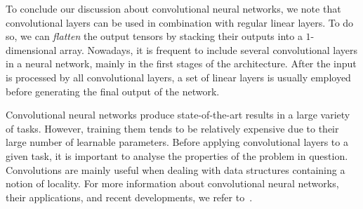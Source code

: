 \begin{figure}
\end{figure}
 
To conclude our discussion about convolutional neural networks, we note that convolutional layers
can be used in combination with regular linear layers. To do so, we can \textit{flatten} the output
tensors by stacking their outputs into a $1$-dimensional array. Nowadays, it is frequent to include
several convolutional layers in a neural network, mainly in the first stages of the architecture.
After the input is processed by all convolutional layers, a set of linear layers is usually employed
before generating the final output of the network.

Convolutional neural networks produce state-of-the-art results in a large variety of tasks. However,
training them tends to be relatively expensive due to their large number of learnable parameters.
Before applying convolutional layers to a given task, it is important to analyse the properties of
the problem in question. Convolutions are mainly useful when dealing with data structures containing
a notion of locality. For more information about convolutional neural networks, their applications,
and recent developments, we refer to~\cite{yamashita2018convolutional, gu2018recent, li2021survey,
kiranyaz20211d}.
